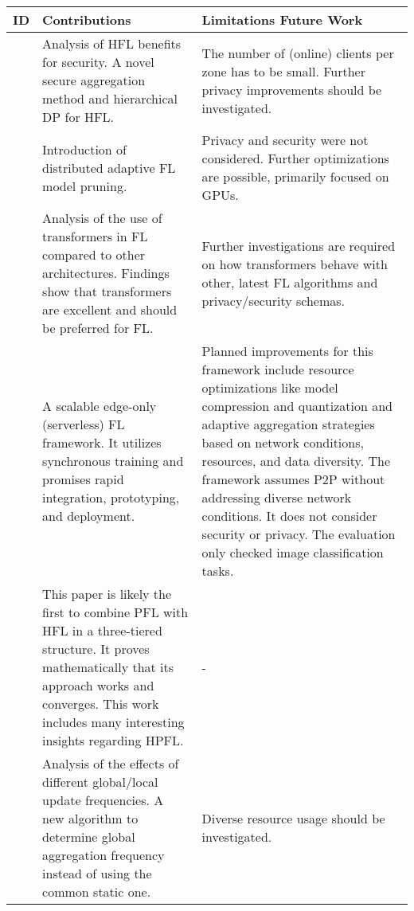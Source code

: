 \begin{changemargin}{-2cm}{0cm} 
    \begin{tabular}{|c||m{0.4\paperwidth}|m{0.4\paperwidth}|}
        \hline
            ID & Contributions & Limitations Future Work \\
        \hline
            \cite{paper:hfl_with_privacy}
            &
            Analysis of HFL benefits for security.
            A novel secure aggregation method and hierarchical DP for HFL.
            &
            The number of (online) clients per zone has to be small.
            Further privacy improvements should be investigated.
        \\
        \hline
            \cite{paper:model_pruning_for_edge_fl}
            &
            Introduction of distributed adaptive FL model pruning.
            &
            Privacy and security were not considered.
            Further optimizations are possible, primarily focused on GPUs.
        \\
        \hline
            \cite{paper:rethinking_architecture_design_in_fl_for_diverse_data}
            &
            Analysis of the use of transformers in FL compared to other architectures.
            Findings show that transformers are excellent and should be preferred for FL.
            &
            Further investigations are required on how transformers behave with other, latest FL algorithms and privacy/security schemas.
        \\
        \hline
            \cite{paper:edgefl_framework}
            &
            A scalable edge-only (serverless) FL framework.
            It utilizes synchronous training and promises rapid integration, prototyping, and deployment.
            &
            Planned improvements for this framework include
            resource optimizations like model compression and quantization and
            adaptive aggregation strategies based on network conditions, resources, and data diversity.
            The framework assumes P2P without addressing diverse network conditions.
            It does not consider security or privacy.
            The evaluation only checked image classification tasks.
        \\
        \hline
            \cite{hpfl_over_massive_mobile_edge_computing_networks}
            & 
            This paper is likely the first to combine PFL with HFL in a three-tiered structure.
            It proves mathematically that its approach works and converges.
            This work includes many interesting insights regarding HPFL.
            &
            -
        \\
        \hline
            \cite{paper:adaptive_fl_for_resource_constrained_edge}
            &
            Analysis of the effects of different global/local update frequencies.
            A new algorithm to determine global aggregation frequency instead of using the common static one.
            &
            Diverse resource usage should be investigated.
        \\


\end{tabular}
\end{changemargin}
